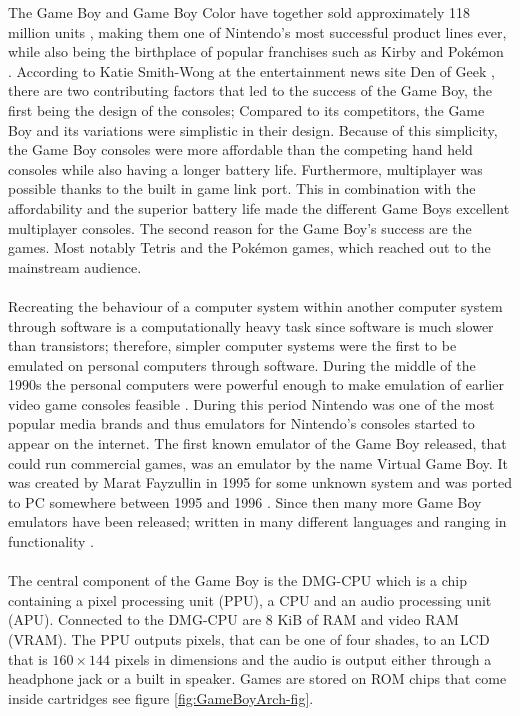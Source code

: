 The Game Boy and Game Boy Color have together sold approximately 118 million units \cite{GBSales}, making them one of Nintendo's most successful product lines ever, while also being the birthplace of popular franchises such as Kirby and Pokémon \cite{gameboytimeline2}. According to Katie Smith-Wong at the entertainment news site Den of Geek \cite{gameboylook}, there are two contributing factors that led to the success of the Game Boy, the first being the design of the consoles; Compared to its competitors, the Game Boy and its variations were simplistic in their design. Because of this simplicity, the Game Boy consoles were more affordable than the competing hand held consoles while also having a longer battery life. Furthermore, multiplayer was possible thanks to the built in game link port. This in combination with the affordability and the superior battery life made the different Game Boys excellent multiplayer consoles. The second reason for the Game Boy's success are the games. Most notably Tetris and the Pokémon games, which reached out to the mainstream audience.\\
\\
Recreating the behaviour of a computer system within another computer system through software is a computationally heavy task since software is much slower than transistors; therefore, simpler computer systems were the first to be emulated on personal computers through software. During the middle of the 1990s the personal computers were powerful enough to make emulation of earlier video game consoles feasible \cite{emunation-history}. During this period Nintendo was one of the most popular media brands \cite{ask-wonder-nintendo} and thus emulators for Nintendo's consoles started to appear on the internet. The first known emulator of the Game Boy released, that could run commercial games, was an emulator by the name Virtual Game Boy. It was created by Marat Fayzullin in 1995 for some unknown system and was ported to PC somewhere between 1995 and 1996 \cite{gameboyemulationhistory}. Since then many more Game Boy emulators have been released; written in many different languages and ranging in functionality \cite{gameboyemulators}.\\
\\
The central component of the Game Boy is the DMG-CPU which is a chip containing a pixel processing unit (PPU), a CPU and an audio processing unit (APU). Connected to the DMG-CPU are 8 KiB of RAM and video RAM (VRAM). The PPU outputs pixels, that can be one of four shades, to an LCD that is $160 \times 144$ pixels in dimensions and the audio is output either through a headphone jack or a built in speaker. Games are stored on ROM chips that come inside cartridges see figure \ref{fig:GameBoyArch-fig}.

